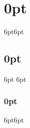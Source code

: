 \documentclass[openany,svgnames]{book}
\begin{document}
\enlargethispage{1.5\baselineskip}
\titleformat{\chapter}[display] {\normalfont\huge\bfseries}{\chaptertitlename\ \thechapter}{20pt}{\Huge}   
\titlespacing*{\chapter}{0pt}{10pt}{10pt}
\titlespacing\section{0pt}{6pt}{6pt}
\titlespacing\subsection{0pt}{6pt }{6pt}
\titlespacing\subsubsection{0pt}{6pt}{6pt}
%
 
\tableofcontents
\label{ch:changes}  
 
\begin{comment}

 



 
 
 
 
 
 
 
 
 
























\addtocontents{toc}{\protect\renewcommand{\protect\cftchappresnum}{Appendix }}

\appendix
 



\end{comment}
\end{document}
